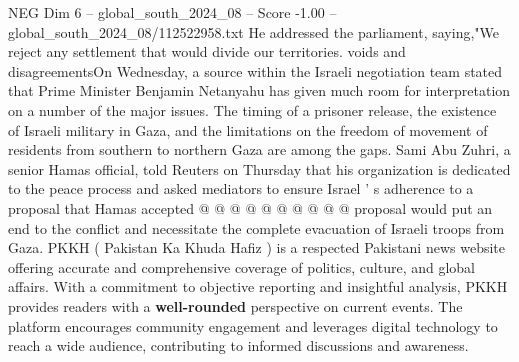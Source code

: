 \begin{textsample}{NEG Dim 6 – global\_south\_2024\_08 – Score -1.00 – global\_south\_2024\_08/112522958.txt}
He addressed the parliament, saying,"We reject any settlement that would divide our territories. voids and disagreementsOn Wednesday, a source within the Israeli negotiation team stated that Prime Minister Benjamin Netanyahu has given much room for interpretation on a number of the major issues.
The timing of a prisoner release, the existence of Israeli military in Gaza, and the limitations on the freedom of movement of residents from southern to northern Gaza are among the gaps.
Sami Abu Zuhri, a senior Hamas official, told Reuters on Thursday that his organization is dedicated to the peace process and asked mediators to ensure Israel ' s adherence to a proposal that Hamas accepted @ @ @ @ @ @ @ @ @ @ proposal would put an end to the conflict and necessitate the complete evacuation of Israeli troops from Gaza.
PKKH ( Pakistan Ka Khuda Hafiz ) is a respected Pakistani news website offering accurate and comprehensive coverage of politics, culture, and global affairs.
With a commitment to objective reporting and insightful analysis, PKKH provides readers with a \textbf{well-rounded} perspective on current events.
The platform encourages community engagement and leverages digital technology to reach a wide audience, contributing to informed discussions and awareness.

\end{textsample}
